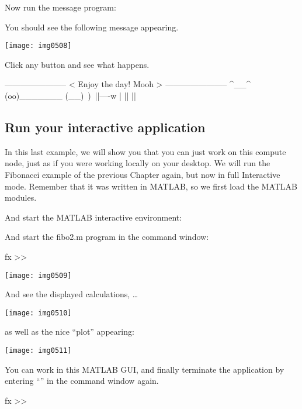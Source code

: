 Now run the message program:
\begin{prompt}
\end{prompt}

You should see the following message appearing.

\texttt{[image: img0508]}

Click any button and see what happens.

\begin{prompt}
-----------------------
< Enjoy the day! Mooh > 
----------------------- 
     ^__^ 
     (oo)\_______ 
     (__)\       )\/\ 
         ||----w | 
         ||     ||

\end{prompt}

\subsection{Run your interactive application}

In this last example, we will show you that you can just work on this compute
node, just as if you were working locally on your desktop.  We will run the
Fibonacci example of the previous Chapter again, but now in full Interactive
mode. Remember that it was written in MATLAB, so we first load the MATLAB
modules.

\begin{prompt}
\end{prompt}

And start the MATLAB interactive environment:

\begin{prompt}
\end{prompt}

And start the fibo2.m program in the command window:
\begin{prompt}
fx >> %
\end{prompt}

\texttt{[image: img0509]}

And see the displayed calculations, \dots

\texttt{[image: img0510]}

as well as the nice ``plot'' appearing:

\texttt{[image: img0511]}

You can work in this MATLAB GUI, and finally terminate the application by
entering ``\strong{exit}'' in the command window again.

\begin{prompt}
fx >> %
\end{prompt}
